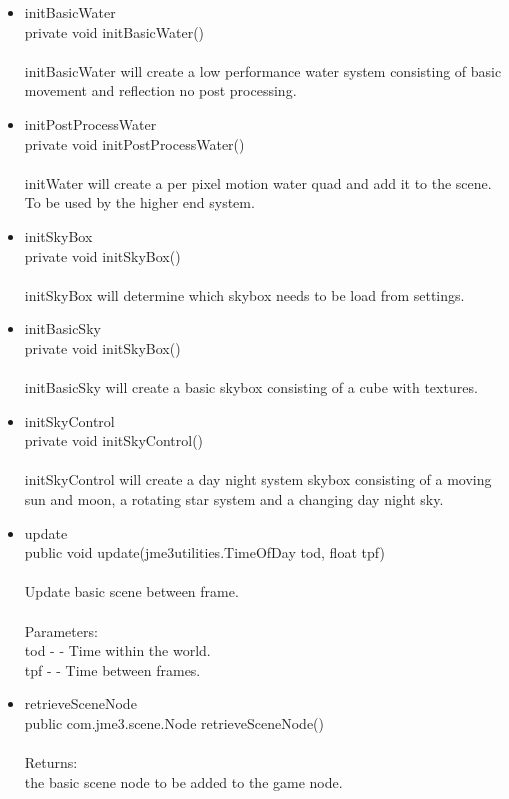 \documentclass[letterpaper]{article}
\begin{document}
\begin{itemize}
\begin{itemize}
													\item	initBasicWater \\
															private void initBasicWater() \\ \\
															initBasicWater will create a low performance water system consisting of basic movement and reflection no post processing. \\
													\item	initPostProcessWater \\
															private void initPostProcessWater() \\ \\
															initWater will create a per pixel motion water quad and add it to the scene. To be used by the higher end system. \\
													\item	initSkyBox \\
															private void initSkyBox() \\ \\ 
															initSkyBox will determine which skybox needs to be load from settings. \\
													\item	initBasicSky \\
															private void initSkyBox() \\ \\ 
															initBasicSky will create a basic skybox consisting of a cube with textures. \\
													\item	initSkyControl \\
															private void initSkyControl() \\ \\ 
															initSkyControl will create a day night system skybox consisting of a moving sun and moon, a rotating star system and a changing day night sky. \\
													\item	update \\
															public void update(jme3utilities.TimeOfDay tod,
						          float tpf) \\ \\
															Update basic scene between frame. \\ \\
															Parameters: \\
															tod - - Time within the world. \\
															tpf - - Time between frames. \\
													\item	retrieveSceneNode \\
															public com.jme3.scene.Node retrieveSceneNode() \\ \\
															Returns: \\
															the basic scene node to be added to the game node.
												\end{itemize}
									\end{itemize}
								
\end{document}
